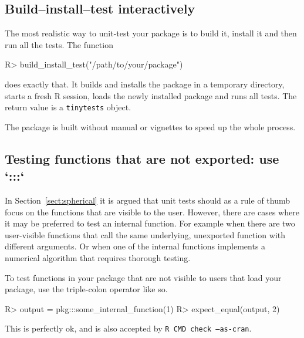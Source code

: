 \documentclass[11pt]{article}
\newcommand{\code}[1]{\texttt{#1}}
\begin{document}
\subsection{Build--install--test interactively}
The most realistic way to unit-test your package is to build it, install it
and then run all the tests. The function
\begin{Schunk}
\begin{Sinput}
R>    build_install_test("/path/to/your/package")
\end{Sinput}
\end{Schunk}
does exactly that. It builds and installs the package in a temporary directory,
starts a fresh R session, loads the newly installed package and runs all tests.
The return value is a \code{tinytests} object.

The package is built without manual or vignettes to speed up the
whole process.

\subsection{Testing functions that are not exported: use `:::`}
In Section~\ref{sect:spherical} it is argued that unit tests should as a rule
of thumb focus on the functions that are visible to the user. However, there
are cases where it may be preferred to test an internal function. For example
when there are two user-visible functions that call the same underlying,
unexported function with different arguments. Or when one of the internal
functions implements a numerical algorithm that requires thorough testing.

To test functions in your package that are not visible to users that load
your package, use the triple-colon operator like so.
\begin{Schunk}
\begin{Sinput}
R>  output = pkg:::some_internal_function(1)
R>  expect_equal(output, 2)
\end{Sinput}
\end{Schunk}
This is perfectly ok, and is also accepted by \code{R CMD check --as-cran}.
\end{document}
